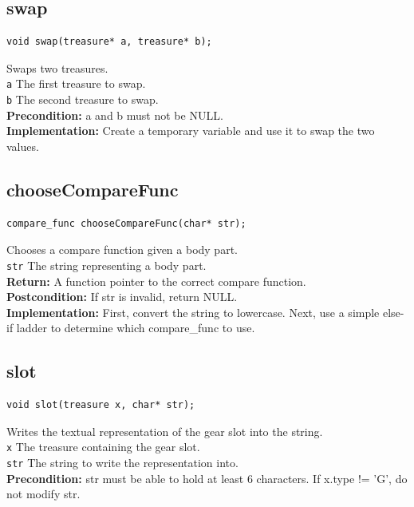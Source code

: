 \documentclass{article}
\begin{document}
\subsection{swap}
\begin{lstlisting}
void swap(treasure* a, treasure* b);
\end{lstlisting}


  Swaps two treasures.\\ 
 \texttt{a} The first treasure to swap.\\ 
 \texttt{b} The second treasure to swap.\\ 
 \textbf{Precondition:}  a and  b must not be NULL.\\ 
 
 
 \textbf{Implementation:}
Create a temporary variable and use it to swap the two values.
 

\subsection{chooseCompareFunc}
\begin{lstlisting}
compare_func chooseCompareFunc(char* str);
\end{lstlisting}


  Chooses a compare function given a body part.\\ 
 \texttt{str} The string representing a body part.\\ 
 \textbf{Return:} A function pointer to the correct compare function.\\ 
 \textbf{Postcondition:} If  str is invalid, return NULL.\\ 
 
 
 \textbf{Implementation:}
First, convert the string to lowercase.
Next, use a simple else-if ladder to determine
which  compare\_func to use.
 

\subsection{slot}
\begin{lstlisting}
void slot(treasure x, char* str);
\end{lstlisting}


  Writes the textual representation of the gear slot into the string.\\ 
 \texttt{x} The treasure containing the gear slot.\\ 
 \texttt{str} The string to write the representation into.\\ 
 \textbf{Precondition:}  str must be able to hold at least 6 characters.
  If  x.type != 'G', do not modify  str.\\ 
 
\end{document}
